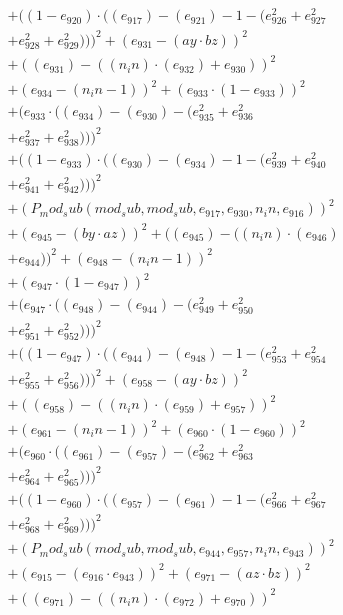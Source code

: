 \documentclass[10pt, a4paper]{article}
\begin{document}
\begin{align*}
& + ((1 - e_{920})  \cdot  ((e_{917}) - (e_{921}) - 1 - (e_{926}^{2} + e_{927}^{2} \\
& + e_{928}^{2} + e_{929}^{2})))^{2} + (e_{931} - (ay  \cdot  bz))^{2} \\
& + ((e_{931}) - ((n_in)  \cdot  (e_{932}) + e_{930}))^{2} \\
& + (e_{934} - (n_in - 1))^{2} + (e_{933}  \cdot  (1 - e_{933}))^{2} \\
& + (e_{933}  \cdot  ((e_{934}) - (e_{930}) - (e_{935}^{2} + e_{936}^{2} \\
& + e_{937}^{2} + e_{938}^{2})))^{2} \\
& + ((1 - e_{933})  \cdot  ((e_{930}) - (e_{934}) - 1 - (e_{939}^{2} + e_{940}^{2} \\
& + e_{941}^{2} + e_{942}^{2})))^{2} \\
& + (P_mod_sub(mod_sub, mod_sub, e_{917}, e_{930}, n_in, e_{916}))^{2} \\
& + (e_{945} - (by  \cdot  az))^{2} + ((e_{945}) - ((n_in)  \cdot  (e_{946}) \\
& + e_{944}))^{2} + (e_{948} - (n_in - 1))^{2} \\
& + (e_{947}  \cdot  (1 - e_{947}))^{2} \\
& + (e_{947}  \cdot  ((e_{948}) - (e_{944}) - (e_{949}^{2} + e_{950}^{2} \\
& + e_{951}^{2} + e_{952}^{2})))^{2} \\
& + ((1 - e_{947})  \cdot  ((e_{944}) - (e_{948}) - 1 - (e_{953}^{2} + e_{954}^{2} \\
& + e_{955}^{2} + e_{956}^{2})))^{2} + (e_{958} - (ay  \cdot  bz))^{2} \\
& + ((e_{958}) - ((n_in)  \cdot  (e_{959}) + e_{957}))^{2} \\
& + (e_{961} - (n_in - 1))^{2} + (e_{960}  \cdot  (1 - e_{960}))^{2} \\
& + (e_{960}  \cdot  ((e_{961}) - (e_{957}) - (e_{962}^{2} + e_{963}^{2} \\
& + e_{964}^{2} + e_{965}^{2})))^{2} \\
& + ((1 - e_{960})  \cdot  ((e_{957}) - (e_{961}) - 1 - (e_{966}^{2} + e_{967}^{2} \\
& + e_{968}^{2} + e_{969}^{2})))^{2} \\
& + (P_mod_sub(mod_sub, mod_sub, e_{944}, e_{957}, n_in, e_{943}))^{2} \\
& + (e_{915} - (e_{916}  \cdot  e_{943}))^{2} + (e_{971} - (az  \cdot  bz))^{2} \\
& + ((e_{971}) - ((n_in)  \cdot  (e_{972}) + e_{970}))^{2} \\

\end{align*}
\end{document}
